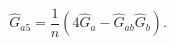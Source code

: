 \begin{equation} 
\hat{G}_{a5}=\frac{1}{n}\left(
4\hat{G}_{a}-\hat{G}_{ab}\hat{G}_{b}\right). 
\label{g5ga} 
\end{equation} 
